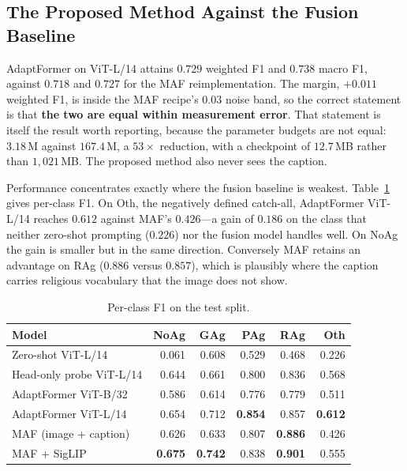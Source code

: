 \documentclass[conference]{IEEEtran}
\begin{document}
\subsection{The Proposed Method Against the Fusion Baseline}

AdaptFormer on ViT-L/14 attains $0.729$ weighted F1 and $0.738$ macro F1,
against $0.718$ and $0.727$ for the MAF reimplementation. The margin,
$+0.011$ weighted F1, is inside the MAF recipe's $0.03$ noise band, so the
correct statement is that \textbf{the two are equal within measurement error}.
That statement is itself the result worth reporting, because the parameter
budgets are not equal: $3.18$\,M against $167.4$\,M, a $53{\times}$ reduction,
with a checkpoint of $12.7$\,MB rather than $1{,}021$\,MB. The proposed method
also never sees the caption.

Performance concentrates exactly where the fusion baseline is weakest.
Table~\ref{tab:perclass} gives per-class F1. On Oth, the negatively defined
catch-all, AdaptFormer ViT-L/14 reaches $0.612$ against MAF's $0.426$---a gain
of $0.186$ on the class that neither zero-shot prompting ($0.226$) nor the
fusion model handles well. On NoAg the gain is smaller but in the same
direction. Conversely MAF retains an advantage on RAg ($0.886$ versus $0.857$),
which is plausibly where the caption carries religious vocabulary that the image
does not show.

\begin{table}[t]
\caption{Per-class F1 on the test split.}
\label{tab:perclass}
\centering
\footnotesize
\begin{tabular}{lrrrrr}
\toprule
Model & NoAg & GAg & PAg & RAg & Oth \\
\midrule
Zero-shot ViT-L/14        & 0.061 & 0.608 & 0.529 & 0.468 & 0.226 \\
Head-only probe ViT-L/14  & 0.644 & 0.661 & 0.800 & 0.836 & 0.568 \\
AdaptFormer ViT-B/32      & 0.586 & 0.614 & 0.776 & 0.779 & 0.511 \\
AdaptFormer ViT-L/14      & 0.654 & 0.712 & \textbf{0.854} & 0.857 & \textbf{0.612} \\
MAF (image + caption)     & 0.626 & 0.633 & 0.807 & \textbf{0.886} & 0.426 \\
MAF + SigLIP              & \textbf{0.675} & \textbf{0.742} & 0.838 & \textbf{0.901} & 0.555 \\
\bottomrule
\end{tabular}
\end{table}
\end{document}

